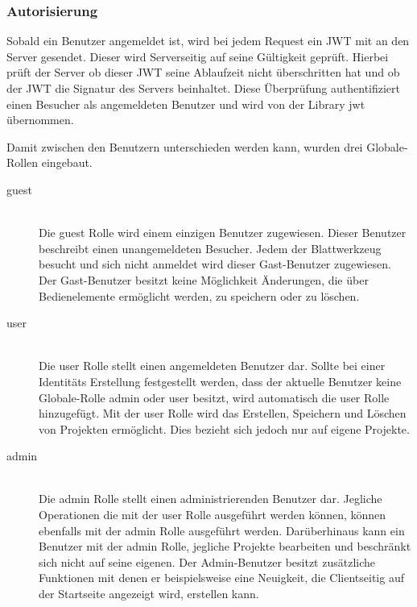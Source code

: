 \documentclass[paper=a4,fontsize=12pt,parskip=half]{scrartcl}
\begin{document}
	\subsubsection{Autorisierung}
	Sobald ein Benutzer angemeldet ist, wird bei jedem Request ein \gls{JWT} mit an den Server gesendet. Dieser wird Serverseitig auf seine Gültigkeit geprüft. Hierbei prüft der Server ob dieser \gls{JWT} seine Ablaufzeit nicht überschritten hat und ob der \gls{JWT} die Signatur des Servers beinhaltet. Diese Überprüfung authentifiziert einen Besucher als angemeldeten Benutzer und wird von der Library jwt übernommen.

	Damit zwischen den Benutzern unterschieden werden kann, wurden drei Globale-Rollen eingebaut.

	\begin{description}
		\item[guest]\hfill\\
		Die guest Rolle wird einem einzigen Benutzer zugewiesen. Dieser Benutzer beschreibt einen unangemeldeten Besucher. Jedem der Blattwerkzeug besucht und sich nicht anmeldet wird dieser Gast-Benutzer zugewiesen. Der Gast-Benutzer besitzt keine Möglichkeit Änderungen, die über Bedienelemente ermöglicht werden, zu speichern oder zu löschen.
		\item[user]\hfill\\
		Die user Rolle stellt einen angemeldeten Benutzer dar. Sollte bei einer Identitäts Erstellung festgestellt werden, dass der aktuelle Benutzer keine Globale-Rolle admin oder user besitzt, wird automatisch die user Rolle hinzugefügt. Mit der user Rolle wird das Erstellen, Speichern und Löschen von Projekten ermöglicht. Dies bezieht sich jedoch nur auf eigene Projekte.
		\item[admin]\hfill\\
		Die admin Rolle stellt einen administrierenden Benutzer dar. Jegliche Operationen die mit der user Rolle ausgeführt werden können, können ebenfalls mit der admin Rolle ausgeführt werden. Darüberhinaus kann ein Benutzer mit der admin Rolle, jegliche Projekte bearbeiten und beschränkt sich nicht auf seine eigenen. Der Admin-Benutzer besitzt zusätzliche Funktionen mit denen er beispielsweise eine Neuigkeit, die Clientseitig auf der Startseite angezeigt wird, erstellen kann.
	\end{description}
\end{document}
